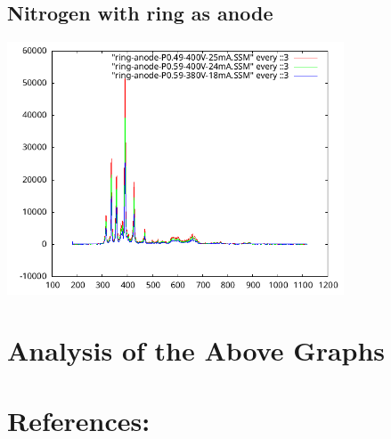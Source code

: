 \documentclass[]{report}[12 pt]
\begin{document}
\subsection{Nitrogen with ring as anode }
\begin{center}
	\includegraphics[width=10cm]{nitrogen_ring_anode.png}
\end{center}

\section{Analysis of the Above Graphs}
\section*{References:}
\end{document}
